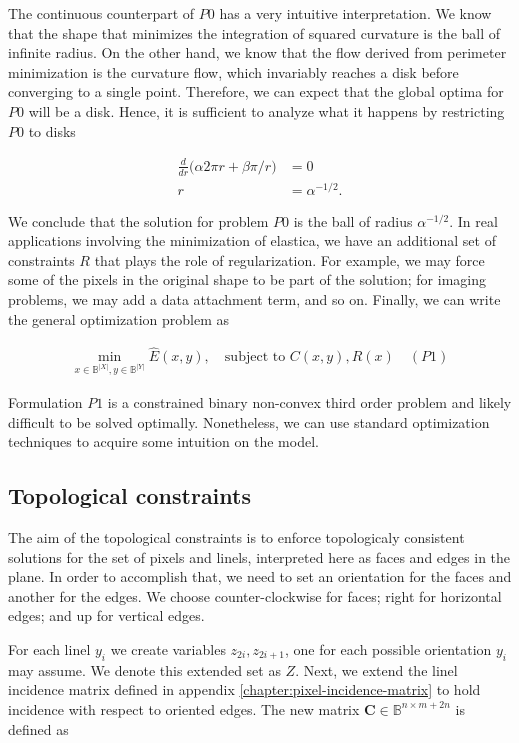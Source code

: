 The continuous counterpart of $P0$ has a very intuitive interpretation. We know that the shape that minimizes the integration of squared curvature is the ball of infinite radius. On the other hand, we know that the flow derived from perimeter minimization is the curvature flow, which invariably reaches a disk before converging to a single point. Therefore, we can expect that the global optima for $P0$ will be a disk. Hence, it is sufficient to analyze what it happens by restricting $P0$ to disks

\begin{align*}
	\frac{d}{dr}\big( \alpha 2\pi r + \beta \pi/r \big) &= 0\\
	r &= \alpha^{-1/2}.
\end{align*}  

We conclude that the solution for problem $P0$ is the ball of radius $\alpha^{-1/2}$. In real applications involving the minimization of elastica, we have an additional set of constraints $R$ that plays the role of regularization. For example, we may force some of the pixels in the original shape to be part of the solution; for imaging problems, we may add a data attachment term, and so on. Finally, we can write the general optimization problem as

\begin{align*}
	\min_{x \in \mathbb{B}^{|X|}, y \in \mathbb{B}^{|Y|}}{\hat{E}(x,y)}, \quad \text{subject to } C(x,y), R(x) \quad (P1)
\end{align*}

	Formulation $P1$ is a constrained binary non-convex third order problem and likely difficult to be solved optimally. Nonetheless, we can use standard optimization techniques to acquire some intuition on the model. 	
	
\subsection{Topological constraints}



The aim of the topological constraints is to enforce topologicaly consistent solutions for the set of pixels and linels, interpreted here as faces and edges in the plane. In order to accomplish that, we need to set an orientation for the faces and another for the edges. We choose counter-clockwise for faces; right for horizontal edges; and up for vertical edges.


For each linel $y_i$ we create variables $z_{2i},z_{2i+1}$, one for each possible orientation $y_i$ may assume. We denote this extended set as $Z$. Next, we extend the linel incidence matrix defined in appendix \ref{chapter:pixel-incidence-matrix} to hold incidence with respect to oriented edges. The new matrix $\mathbf{C} \in \mathbb{B}^{n \times m + 2n}$ is defined as

